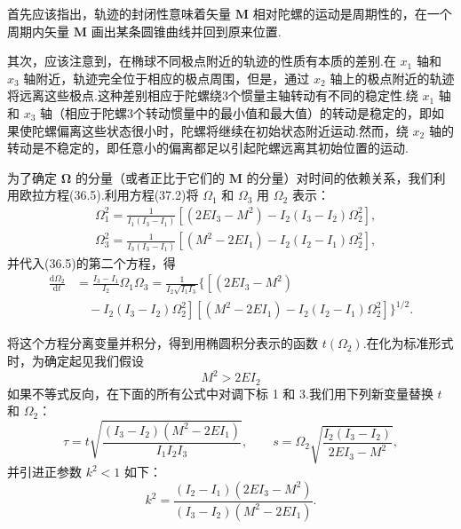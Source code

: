 首先应该指出，轨迹的封闭性意味着矢量 $\boldsymbol{M}$ 相对陀螺的运动是周期性的，在一个周期内矢量 $\boldsymbol{M}$ 画出某条圆锥曲线并回到原来位置.

其次，应该注意到，在椭球不同极点附近的轨迹的性质有本质的差别.在 $x_1$ 轴和 $x_3$ 轴附近，轨迹完全位于相应的极点周围，但是，通过 $x_2$ 轴上的极点附近的轨迹将远离这些极点.这种差别相应于陀螺绕3个惯量主轴转动有不同的稳定性.绕 $x_1$ 轴和 $x_3$ 轴（相应于陀螺3个转动惯量中的最小值和最大值）的转动是稳定的，即如果使陀螺偏离这些状态很小时，陀螺将继续在初始状态附近运动.然而，绕 $x_2$ 轴的转动是不稳定的，即任意小的偏离都足以引起陀螺远离其初始位置的运动.

为了确定 $\boldsymbol{\Omega}$ 的分量（或者正比于它们的 $\boldsymbol{M}$ 的分量）对时间的依赖关系，我们利用欧拉方程(36.5).利用方程(37.2)将 $\Omega_1$ 和 $\Omega_3$ 用 $\Omega_2$ 表示：
\begin{equation}
\begin{aligned}
  &\Omega_1^2=\frac{1}{I_1(I_3-I_1)}
  \left[\left(2EI_3-M^2\right)
  -I_2(I_3-I_2)\Omega_2^2\right],\\
  &\Omega_3^2=\frac{1}{I_3(I_3-I_1)}
  \left[\left(M^2-2EI_1\right)
  -I_2(I_2-I_1)\Omega_2^2\right],
\end{aligned}
\end{equation}
并代入(36.5)的第二个方程，得
\begin{equation}
\begin{aligned}
  \frac{\mathrm{d}\Omega_2}{\mathrm{d}t}
  &=\frac{I_3-I_1}{I_2}\Omega_1\Omega_3
  =\frac{1}{I_2\sqrt{I_1I_3}}\bigl\{\left[\left(2EI_3-M^2\right)\right.\\
  &\quad-\left.I_2(I_3-I_2)\Omega_2^2\right]
  \left[\left(M^2-2EI_1\right)
  -I_2(I_2-I_1)\Omega_2^2\right]\bigr\}^{1/2}.
\end{aligned}
\end{equation}

将这个方程分离变量并积分，得到用椭圆积分表示的函数 $t(\Omega_2)$.在化为标准形式时，为确定起见我们假设
\begin{equation*}
  M^2>2EI_2
\end{equation*}
如果不等式反向，在下面的所有公式中对调下标 1 和 3.我们用下列新变量替换 $t$ 和 $\Omega_2$：
\begin{equation}
  \tau=t\sqrt{\frac{(I_3-I_2)(M^2-2EI_1)}{I_1I_2I_3}},\qquad
  s=\Omega_2\sqrt{\frac{I_2(I_3-I_2)}{2EI_3-M^2}},
\end{equation}
并引进正参数 $k^2<1$ 如下：
\begin{equation}
  k^2=\frac{(I_2-I_1)(2EI_3-M^2)}
  {(I_3-I_2)(M^2-2EI_1)}.
\end{equation}

